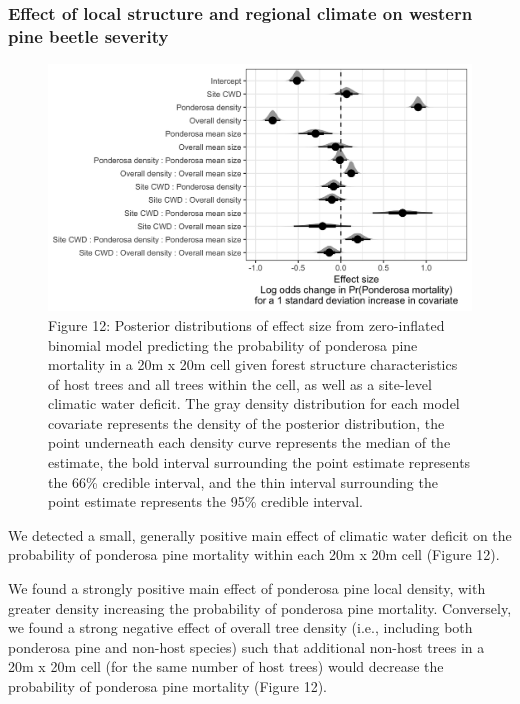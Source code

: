 \documentclass[]{article}
\begin{document}
\subsubsection{Effect of local structure and regional climate on western
pine beetle
severity}\label{effect-of-local-structure-and-regional-climate-on-western-pine-beetle-severity}

\begin{figure}
\centering
\includegraphics{../../figures/effect-sizes-halfeye.png}
\caption{Figure 12: Posterior distributions of effect size from
zero-inflated binomial model predicting the probability of ponderosa
pine mortality in a 20m x 20m cell given forest structure
characteristics of host trees and all trees within the cell, as well as
a site-level climatic water deficit. The gray density distribution for
each model covariate represents the density of the posterior
distribution, the point underneath each density curve represents the
median of the estimate, the bold interval surrounding the point estimate
represents the 66\% credible interval, and the thin interval surrounding
the point estimate represents the 95\% credible interval.}
\end{figure}

We detected a small, generally positive main effect of climatic water
deficit on the probability of ponderosa pine mortality within each 20m x
20m cell (Figure 12).

We found a strongly positive main effect of ponderosa pine local
density, with greater density increasing the probability of ponderosa
pine mortality. Conversely, we found a strong negative effect of overall
tree density (i.e., including both ponderosa pine and non-host species)
such that additional non-host trees in a 20m x 20m cell (for the same
number of host trees) would decrease the probability of ponderosa pine
mortality (Figure 12).
\end{document}
